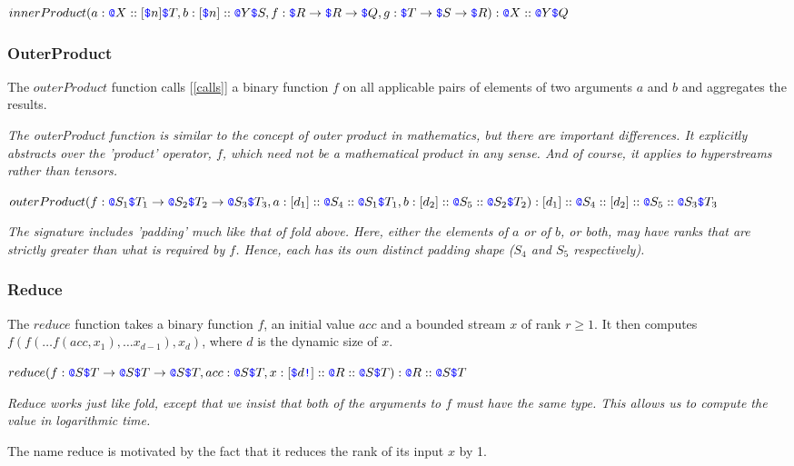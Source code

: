 \documentclass{article}
\begin{document}
$innerProduct(a: \texttt{\color{blue} @}{}X:: [\texttt{\color{blue} \$}{}n]\texttt{\color{blue} \$}{}T, b: [\texttt{\color{blue} \$}{}n]::\texttt{\color{blue} @}{}Y\texttt{\color{blue} \$}{}S,  f: \texttt{\color{blue} \$}{}R \to \texttt{\color{blue} \$}{}R \to \texttt{\color{blue} \$}{}Q, g: \texttt{\color{blue} \$}{}T \to \texttt{\color{blue} \$}{}S \to \texttt{\color{blue} \$}{}R): \texttt{\color{blue} @}{}X::\texttt{\color{blue} @}{}Y\texttt{\color{blue} \$}{}Q$

\subsubsection{OuterProduct}
\label{outerProduct}

The $outerProduct$ function calls [\ref{calls}] a binary function $f$ on all applicable pairs of elements of two arguments $a$ and $b$ and aggregates the results.

{\em
The outerProduct function is similar to the concept of outer product in mathematics, but there are important differences. It explicitly abstracts over the 'product' operator, $f$, which need not be a mathematical product in any sense. And of course, it applies to hyperstreams rather than tensors.
}

$outerProduct(f: \texttt{\color{blue} @}{}S_1 \texttt{\color{blue} \$}{}T_1 \to{} \texttt{\color{blue} @}{}S_2 \texttt{\color{blue} \$}{}T_2 \to{} \texttt{\color{blue} @}{}S_3 \texttt{\color{blue} \$}{}T_3, a: [d_1]::\texttt{\color{blue} @}{}S_4::\texttt{\color{blue} @}{}S_1 \texttt{\color{blue} \$}{}T_1, b: [d_2]::\texttt{\color{blue} @}{}S_5::\texttt{\color{blue} @}{}S_2 \texttt{\color{blue} \$}{}T_2): [d_1]::\texttt{\color{blue} @}{}S_4::[d_2]::\texttt{\color{blue} @}{}S_5::\texttt{\color{blue} @}{}S_3 \texttt{\color{blue} \$}{}T_3$

{\em
The signature includes 'padding' much like that of fold above. Here, either the elements of $a$ or of $b$, or both, may have ranks that are strictly greater than what is required by $f$.
Hence, each has its own distinct padding shape ($S_4$ and $S_5$ respectively).
}


\subsubsection{Reduce}
\label{reduce}

The $reduce$ function takes a binary function $f$, an initial value $acc$ and a bounded stream $x$ of rank $r \ge 1$. It then computes
$f(f( \ldots f(acc, x_1), \ldots x_{d-1}), x_d)$, where $d$ is the dynamic size of $x$.

$reduce(f: \texttt{\color{blue} @}{}S \texttt{\color{blue} \$}{}T \to{} \texttt{\color{blue} @}{}S \texttt{\color{blue} \$}{}T \to{} \texttt{\color{blue} @}{}S \texttt{\color{blue} \$}{}T, acc: \texttt{\color{blue} @}{}S \texttt{\color{blue} \$}{}T, x:[\texttt{\color{blue} \$}{}d\texttt{\color{blue} !}]::\texttt{\color{blue} @}{}R::\texttt{\color{blue} @}{}S \texttt{\color{blue} \$}{}T): \texttt{\color{blue} @}{}R::\texttt{\color{blue} @}{}S \texttt{\color{blue} \$}{}T$

{\em
Reduce works just like fold, except that we insist that both of the arguments to $f$ must have the same type. This allows us to compute the
value in logarithmic time.

The name reduce is motivated by the fact that it reduces the rank of its input $x$ by 1.
}
\end{document}

